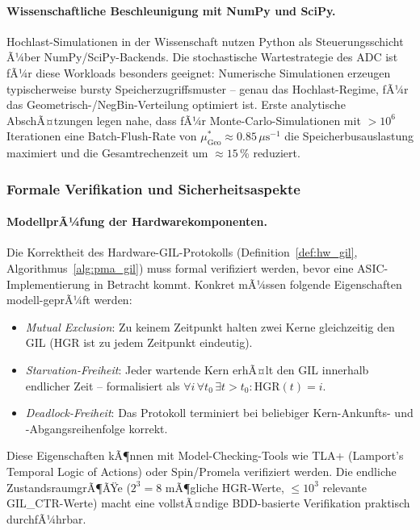 ﻿\documentclass[a4paper,12pt]{scrreprt}
\theoremstyle{definition}
\begin{document}
	\paragraph{Wissenschaftliche Beschleunigung mit NumPy und SciPy.}
	Hochlast-Simulationen in der Wissenschaft nutzen Python als Steuerungsschicht
	Ã¼ber NumPy/SciPy-Backends. Die stochastische Wartestrategie des ADC ist
	fÃ¼r diese Workloads besonders geeignet: Numerische Simulationen erzeugen
	typischerweise bursty Speicherzugriffsmuster -- genau das Hochlast-Regime,
	fÃ¼r das Geometrisch-/NegBin-Verteilung optimiert ist. Erste analytische AbschÃ¤tzungen legen nahe, dass fÃ¼r
	Monte-Carlo-Simulationen mit $> 10^6$ Iterationen eine Batch-Flush-Rate von
	$\mu_{\mathrm{Geo}}^* \approx 0.85\,\mu\mathrm{s}^{-1}$ die Speicherbusauslastung
	maximiert und die Gesamtrechenzeit um $\approx 15$\,\% reduziert.

	\subsubsection{Formale Verifikation und Sicherheitsaspekte}

	\paragraph{ModellprÃ¼fung der Hardwarekomponenten.}
	Die Korrektheit des Hardware-GIL-Protokolls (Definition~\ref{def:hw_gil},
	Algorithmus~\ref{alg:pma_gil}) muss formal verifiziert werden, bevor eine
	ASIC-Implementierung in Betracht kommt. Konkret mÃ¼ssen folgende Eigenschaften
	modell-geprÃ¼ft werden:
	\begin{itemize}[noitemsep]
		\item \emph{Mutual Exclusion}: Zu keinem Zeitpunkt halten zwei Kerne
		gleichzeitig den GIL ($\mathrm{HGR}$ ist zu jedem Zeitpunkt eindeutig).
		\item \emph{Starvation-Freiheit}: Jeder wartende Kern erhÃ¤lt den GIL
		innerhalb endlicher Zeit -- formalisiert als
		$\forall i\, \forall t_0 \, \exists t > t_0 : \mathrm{HGR}(t) = i$.
		\item \emph{Deadlock-Freiheit}: Das Protokoll terminiert bei beliebiger
		Kern-Ankunfts- und -Abgangsreihenfolge korrekt.
	\end{itemize}
	Diese Eigenschaften kÃ¶nnen mit Model-Checking-Tools wie TLA+ (Lamport's
	Temporal Logic of Actions) oder Spin/Promela verifiziert werden. Die
	endliche ZustandsraumgrÃ¶ÃŸe ($2^3 = 8$ mÃ¶gliche HGR-Werte, $\le 10^3$
	relevante GIL\_CTR-Werte) macht eine vollstÃ¤ndige BDD-basierte Verifikation
	praktisch durchfÃ¼hrbar.
\end{document}
